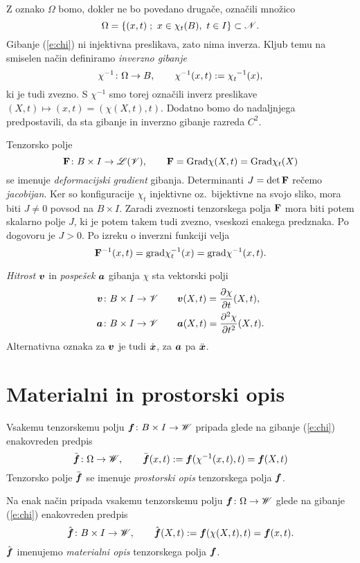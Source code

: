 Z oznako $\Omega$ bomo, dokler ne bo povedano drugače, označili množico
\[ \Omega=\{(x,t)\;;\ x\in\chi_t(B),\ t\in I\}\subset\mathscr N. \]
Gibanje (\ref{e:chi}) ni injektivna preslikava, zato nima inverza. Kljub temu na smiselen
način definiramo \emph{inverzno gibanje}
\[
	\chi^{-1}\colon\Omega\to B,\qquad
	\chi^{-1}(x,t):=\bottop{\chi}{t}{-1}(x),
\]
ki je tudi zvezno. S $\chi^{-1}$ smo torej označili inverz preslikave
$(X,t)\mapsto(x,t)=(\chi(X,t),t)$. Dodatno bomo do nadaljnjega predpostavili, da sta gibanje
in inverzno gibanje razreda $C^2$.

Tenzorsko polje
\[
	\mathbf F\colon B\times I\to\mathscr L(\mathscr V),\qquad \mathbf F=\mathrm{Grad}\chi(X,t)=\mathrm{Grad}\chi_t(X)
\]
se imenuje \emph{deformacijski gradient} gibanja. Determinanti $J=\det\mathbf F$ 
rečemo \emph{jacobijan}. Ker so konfiguracije $\chi_t$
injektivne oz.~bijektivne na svojo sliko, mora biti $J\neq 0$ povsod na $B\times I$.
Zaradi zveznosti tenzorskega polja $\mathbf F$ mora biti potem skalarno polje $J$,
ki je potem takem tudi zvezno, vseskozi
enakega predznaka. Po dogovoru je $J>0$. Po izreku o inverzni funkciji velja
\[
	\mathbf F^{-1}(x,t)=\mathrm{grad}\chi_t^{-1}(x)=\mathrm{grad}\chi^{-1}(x,t).
\]

\emph{Hitrost} $\boldsymbol v$ in \emph{pospešek} $\boldsymbol a$ gibanja $\chi$ sta vektorski polji
\begin{align}
	\boldsymbol v\colon B\times I\to \mathscr V \qquad & \boldsymbol v(X,t) = \frac{\partial\chi}{\partial t}(X,t), \label{e:v} \\
	\boldsymbol a\colon B\times I\to \mathscr V \qquad & \boldsymbol a(X,t) = \frac{\partial^2\chi}{\partial t^2}(X,t). \label{e:a}
\end{align}
Alternativna oznaka za $\boldsymbol v$ je tudi $\dot{\boldsymbol x}$, za $\boldsymbol a$ pa $\ddot{\boldsymbol x}$.


\section{Materialni in prostorski opis}


Vsakemu tenzorskemu polju $\boldsymbol f\colon B\times I\to\mathscr W$ pripada glede na gibanje
(\ref{e:chi}) enakovreden predpis
\[
	\bar{\boldsymbol f}\colon\Omega\to\mathscr W,\qquad
	\bar{\boldsymbol f}(x,t):=\boldsymbol f(\chi^{-1}(x,t),t)=\boldsymbol f(X,t)
\]
Tenzorsko polje $\bar{\boldsymbol f}$ se imenuje \emph{prostorski opis} tenzorskega polja $\boldsymbol f$.

Na enak način pripada vsakemu tenzorskemu polju $\boldsymbol f\colon\Omega\to\mathscr W$
glede na gibanje (\ref{e:chi}) enakovreden predpis
\begin{equation} \label{e:matopi}
	\hat{\boldsymbol f}\colon B\times I\to\mathscr W,\qquad
	\hat{\boldsymbol f}(X,t):=\boldsymbol f(\chi(X,t),t)=\boldsymbol f(x,t).
\end{equation}
$\hat{\boldsymbol f}$ imenujemo \emph{materialni opis} tenzorskega polja $\boldsymbol f$.

